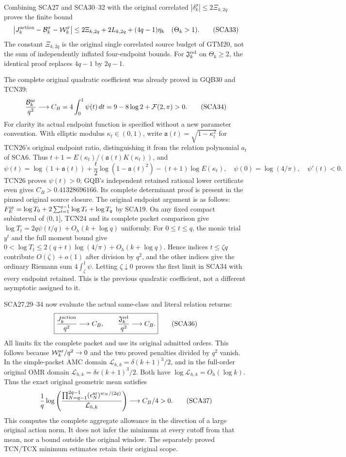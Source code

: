 Combining SCA27 and SCA30--32 with the original correlated
$|\delta_k^\sigma|\le2\Xi_{k,2q}$ proves the finite bound
\[
 \left|J_k^{\rm action}-\mathcal B_k^\sigma
                         -\mathcal W_k^\sigma\right|
 \le2\Xi_{k,2q}+2L_{k,2q}+(4q-1)\eta_k
 \quad(\Theta_k>1).
 \tag{SCA33}
\]
The constant $\Xi_{k,2q}$ is the original single correlated source budget
of GTM20, not the sum of independently inflated four-endpoint bounds.
For $\mathfrak J_k^{\rm rel}$ on $\Theta_k\ge2$, the identical proof
replaces $4q-1$ by $2q-1$.

The complete original quadratic coefficient was already proved in GQB30
and TCN39:
\[
 \frac{\mathcal B_k^{\rm ar}}{q^2}\longrightarrow
 C_B=4\int_0^1\psi(t)\,dt
       =9-8\log2+\mathcal F(2,\pi)>0.
 \tag{SCA34}
\]
For clarity its actual endpoint function is specified without a new
parameter convention. With elliptic modulus $\kappa_t\in(0,1)$, write
$\mathfrak a(t)=\sqrt{1-\kappa_t^2}$ for TCN26's original endpoint ratio,
distinguishing it from the relation polynomial $a_t$ of SCA6. Thus
$t+1=E(\kappa_t)/(\mathfrak a(t)K(\kappa_t))$, and
\[
 \psi(t)=\log(1+\mathfrak a(t))+\frac t2\log(1-\mathfrak a(t)^2)
                         -(t+1)\log E(\kappa_t),
 \quad\psi(0)=\log(4/\pi),\quad\psi'(t)<0.
 \tag{SCA35}
\]
TCN26 proves $\psi(t)>0$; GQB's independent retained rational lower
certificate even gives $C_B>0.41328696166$. Its complete determinant proof
is present in the pinned original source closure. The original endpoint
argument is as follows: $F_E^{\rm ar}=\log T_0+2\sum_{t=1}^{q-1}\log T_t
+\log T_q$ by SCA19. On any fixed compact subinterval of $(0,1]$, TCN24
and its complete packet comparison give
$\log T_t=2q\psi(t/q)+O_h(k+\log q)$ uniformly. For $0\le t\le q$,
the monic trial $y^t$ and the full moment bound give
$0<\log T_t\le2(q+t)\log(4/\pi)+O_h(k+\log q)$.
Hence indices $t\le\zeta q$ contribute $O(\zeta)+o(1)$ after division
by $q^2$, and the other indices give the ordinary Riemann sum
$4\int_\zeta^1\psi$. Letting $\zeta\downarrow0$ proves the first
limit in SCA34 with every endpoint retained. This is the previous
quadratic coefficient, not a different asymptotic assigned to it.

SCA27,29--34 now evaluate the actual same-class and literal relation returns:
\[
 \boxed{\frac{J_k^{\rm action}}{q^2}\longrightarrow C_B,
 \qquad\frac{\mathfrak J_k^{\rm rel}}{q^2}\longrightarrow C_B.}
 \tag{SCA36}
\]
All limits fix the complete packet and use its original admitted orders.
This follows because $\mathcal W_k^{\rm ar}/q^2\to0$ and the two proved
penalties divided by $q^2$ vanish. In the simple-packet AMC domain
$\mathcal L_{h,k}=\delta(k+1)^3/2$, and in the full-order original OMR
domain $\mathcal L_{h,k}=\delta e(k+1)^3/2$. Both have
$\log\mathcal L_{h,k}=O_h(\log k)$. Thus the exact original geometric
mean satisfies
\[
 \frac1q\log\left(
 \frac{\prod_{N=q-1}^{2q-1}(\epsilon_N^{\rm ar})^{w_N/(2q)}}
      {\mathcal L_{h,k}}\right)\longrightarrow C_B/4>0.
 \tag{SCA37}
\]
This computes the complete aggregate allowance in the direction of a
large original action norm. It does not infer the minimum at every cutoff
from that mean, nor a bound outside the original window. The separately
proved TCN/TCX minimum estimates retain their original scope.

